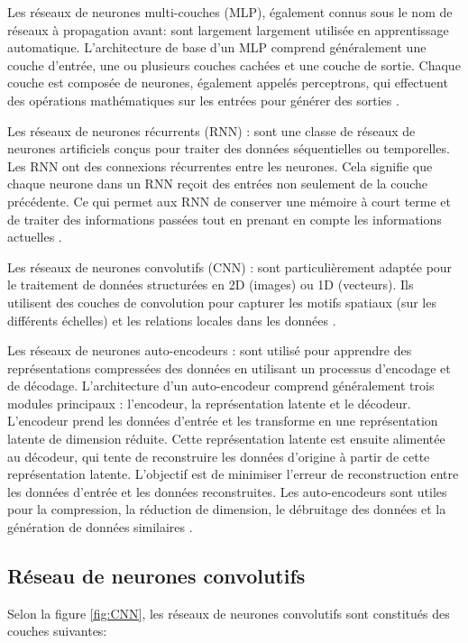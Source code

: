 \begin{outline}
\1  Les réseaux de neurones multi-couches (MLP), également connus sous le nom de réseaux à propagation avant: sont largement largement utilisée en apprentissage automatique. L'architecture de base d'un MLP comprend généralement une couche d'entrée, une ou plusieurs couches cachées et une couche de sortie. Chaque couche est composée de neurones, également appelés perceptrons, qui effectuent des opérations mathématiques sur les entrées pour générer des sorties \cite{MLP_simon2004machine}.

\1  Les réseaux de neurones récurrents (RNN) : sont une classe de réseaux de neurones artificiels conçus pour traiter des données séquentielles ou temporelles. Les RNN ont des connexions récurrentes entre les neurones. Cela signifie que chaque neurone dans un RNN reçoit des entrées non seulement de la couche précédente. Ce qui permet aux RNN de conserver une mémoire à court terme et de traiter des informations passées tout en prenant en compte les informations actuelles \cite{ch_Deep_Learning}.

\1  Les réseaux de neurones convolutifs (CNN) : sont particulièrement adaptée pour le traitement de données structurées en 2D (images) ou 1D (vecteurs). 
Ils utilisent des couches de convolution pour capturer les motifs spatiaux (sur les différents échelles) et les relations locales dans les données \cite{CNN_lecun1998gradient}.

\1  Les réseaux de neurones auto-encodeurs : sont utilisé pour apprendre des représentations compressées des données en utilisant un processus d'encodage et de décodage. L'architecture d'un auto-encodeur comprend généralement trois modules principaux : l'encodeur, la représentation latente et le décodeur. L'encodeur prend les données d'entrée et les transforme en une représentation latente de dimension réduite. Cette représentation latente est ensuite alimentée au décodeur, qui tente de reconstruire les données d'origine à partir de cette représentation latente. L'objectif est de minimiser l'erreur de reconstruction entre les données d'entrée et les données reconstruites. Les auto-encodeurs sont utiles pour la compression, la réduction de dimension, le débruitage des données et la génération de données similaires \cite{auto-encodeurs_hinton2006reducing}.

\end{outline}

\subsection{Réseau de neurones convolutifs}
Selon la figure \ref{fig:CNN}, les réseaux de neurones convolutifs sont constitués des couches suivantes:

